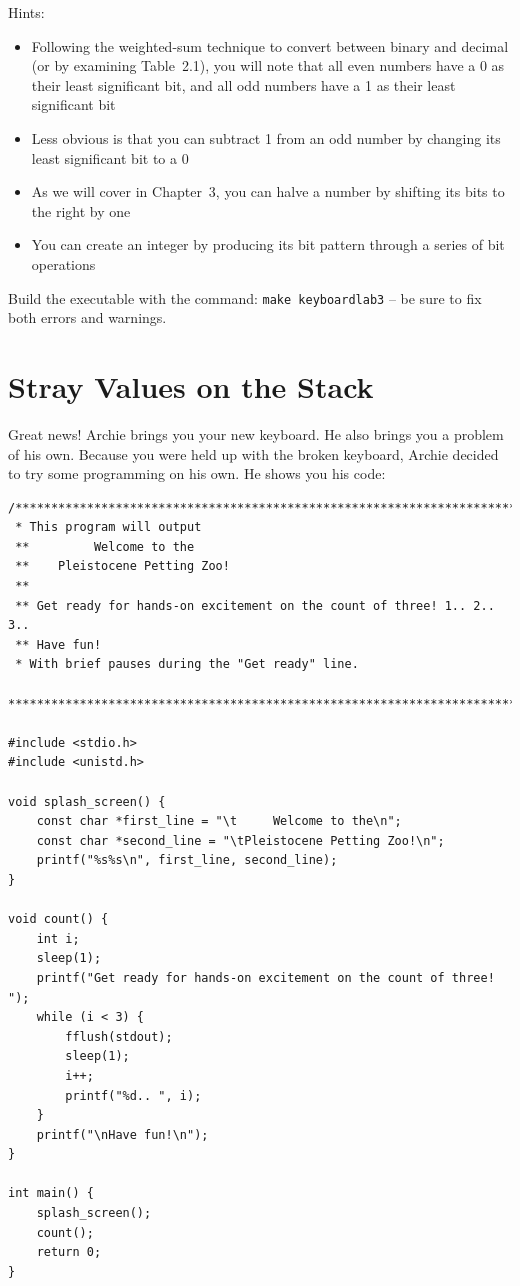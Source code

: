 Hints:
\begin{itemize}
\item Following the weighted-sum technique to convert between binary and
    decimal (or by examining Table~2.1), you will note that all even numbers
    have a 0 as their least significant bit, and all odd numbers have a 1 as
    their least significant bit
\item Less obvious is that you can subtract 1 from an odd number by changing
    its least significant bit to a 0
\item As we will cover in Chapter~3, you can halve a number by shifting its
    bits to the right by one
\item You can create an integer by producing its bit pattern through a series
    of bit operations
\end{itemize}

Build the executable with the command: \texttt{make keyboardlab3} -- be sure to
fix both errors and warnings.


\section{Stray Values on the Stack}

Great news! Archie brings you your new keyboard. He also brings you a problem
of his own. Because you were held up with the broken keyboard, Archie decided
to try some programming on his own. He shows you his code:

\begin{lstlisting}
/***********************************************************************
 * This program will output
 **         Welcome to the
 **    Pleistocene Petting Zoo!
 **
 ** Get ready for hands-on excitement on the count of three! 1.. 2.. 3..
 ** Have fun!
 * With brief pauses during the "Get ready" line.
 ***********************************************************************/

#include <stdio.h>
#include <unistd.h>

void splash_screen() {
    const char *first_line = "\t     Welcome to the\n";
    const char *second_line = "\tPleistocene Petting Zoo!\n";
    printf("%s%s\n", first_line, second_line);
}

void count() {
    int i;
    sleep(1);
    printf("Get ready for hands-on excitement on the count of three! ");
    while (i < 3) {
        fflush(stdout);
        sleep(1);
        i++;
        printf("%d.. ", i);
    }
    printf("\nHave fun!\n");
}

int main() {
    splash_screen();
    count();
    return 0;
}
\end{lstlisting}


